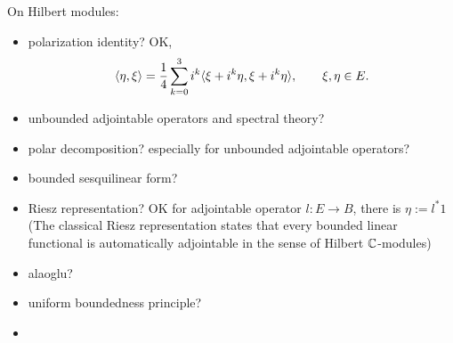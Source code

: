 \documentclass{../../large}
\begin{document}
On Hilbert modules:
\begin{itemize}
\item polarization identity? OK,
\[\langle\eta,\xi\rangle=\frac14\sum_{k=0}^3i^k\langle\xi+i^k\eta,\xi+i^k\eta\rangle,\qquad \xi,\eta\in E.\]
\item unbounded adjointable operators and spectral theory?
\item polar decomposition? especially for unbounded adjointable operators?
\item bounded sesquilinear form?
\item Riesz representation? OK for adjointable operator $l:E\to B$, there is $\eta:=l^*1$ (The classical Riesz representation states that every bounded linear functional is automatically adjointable in the sense of Hilbert $\mathbb{C}$-modules)
\item alaoglu?
\item uniform boundedness principle?
\item 
\end{itemize}
\end{document}
